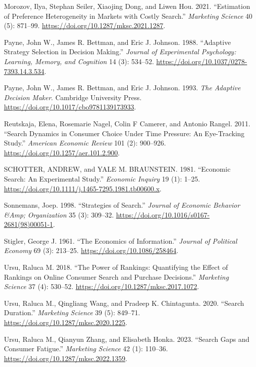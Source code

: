 \documentclass[
  letterpaper,
  DIV=11,
  numbers=noendperiod]{scrartcl}
\newlength{\cslhangindent}
\newenvironment{CSLReferences}[2] %
 {\begin{list}{}{%
  \setlength{\itemindent}{0pt}
  \setlength{\leftmargin}{0pt}
  \setlength{\parsep}{0pt}
  \ifodd #1
   \setlength{\leftmargin}{\cslhangindent}
   \setlength{\itemindent}{-1\cslhangindent}
  \fi
  \setlength{\itemsep}{#2\baselineskip}}}
 {\end{list}}
\begin{document}
\begin{CSLReferences}{1}{1}
Morozov, Ilya, Stephan Seiler, Xiaojing Dong, and Liwen Hou. 2021.
{``Estimation of Preference Heterogeneity in Markets with Costly
Search.''} \emph{Marketing Science} 40 (5): 871--99.
\url{https://doi.org/10.1287/mksc.2021.1287}.

Payne, John W., James R. Bettman, and Eric J. Johnson. 1988. {``Adaptive
Strategy Selection in Decision Making.''} \emph{Journal of Experimental
Psychology: Learning, Memory, and Cognition} 14 (3): 534--52.
\url{https://doi.org/10.1037/0278-7393.14.3.534}.

Payne, John W., James R. Bettman, and Eric J. Johnson. 1993. \emph{The
Adaptive Decision Maker}. Cambridge University Press.
\url{https://doi.org/10.1017/cbo9781139173933}.

Reutskaja, Elena, Rosemarie Nagel, Colin F Camerer, and Antonio Rangel.
2011. {``Search Dynamics in Consumer Choice Under Time Pressure: An
Eye-Tracking Study.''} \emph{American Economic Review} 101 (2):
900--926. \url{https://doi.org/10.1257/aer.101.2.900}.

SCHOTTER, ANDREW, and YALE M. BRAUNSTEIN. 1981. {``Economic Search: An
Experimental Study.''} \emph{Economic Inquiry} 19 (1): 1--25.
\url{https://doi.org/10.1111/j.1465-7295.1981.tb00600.x}.

Sonnemans, Joep. 1998. {``Strategies of Search.''} \emph{Journal of
Economic Behavior \&Amp; Organization} 35 (3): 309--32.
\url{https://doi.org/10.1016/s0167-2681(98)00051-1}.

Stigler, George J. 1961. {``The Economics of Information.''}
\emph{Journal of Political Economy} 69 (3): 213--25.
\url{https://doi.org/10.1086/258464}.

Ursu, Raluca M. 2018. {``The Power of Rankings: Quantifying the Effect
of Rankings on Online Consumer Search and Purchase Decisions.''}
\emph{Marketing Science} 37 (4): 530--52.
\url{https://doi.org/10.1287/mksc.2017.1072}.

Ursu, Raluca M., Qingliang Wang, and Pradeep K. Chintagunta. 2020.
{``Search Duration.''} \emph{Marketing Science} 39 (5): 849--71.
\url{https://doi.org/10.1287/mksc.2020.1225}.

Ursu, Raluca M., Qianyun Zhang, and Elisabeth Honka. 2023. {``Search
Gaps and Consumer Fatigue.''} \emph{Marketing Science} 42 (1): 110--36.
\url{https://doi.org/10.1287/mksc.2022.1359}.


\end{CSLReferences}
\end{document}
